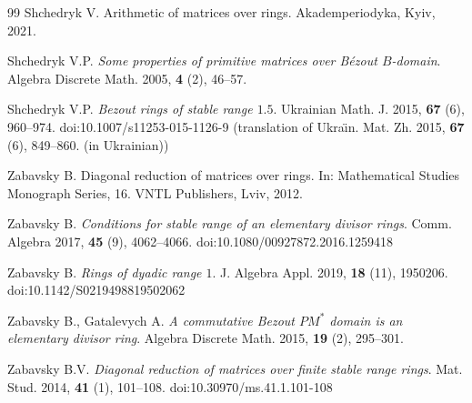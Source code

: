 \documentclass[10pt,a4paper]{amsart}
\theoremstyle{plain}
\theoremstyle{definition}
\begin{document}
\begin{thebibliography}{99}
 Shchedryk V. Arithmetic of matrices over rings.
Akademperiodyka, Kyiv, 2021. %

 Shchedryk V.P. \textit{Some properties of primitive matrices over B\'ezout $B$-domain}.
Algebra Discrete Math. 2005, \textbf{4} (2), 46--57.

 Shchedryk V.P. \textit{Bezout rings of stable range $1.5$}.
Ukrainian Math. J. 2015, \textbf{67} (6), 960--974. doi:10.1007/s11253-015-1126-9
(translation of Ukra\"{\i}n. Mat. Zh. 2015, \textbf{67} (6), 849--860. (in Ukrainian))

 Zabavsky B. Diagonal reduction of matrices over rings.
In: Mathematical Studies Monograph Series, 16.
VNTL Publishers, Lviv, 2012.

 Zabavsky B. \textit{Conditions for stable range of an elementary divisor rings}.
Comm. Algebra 2017, \textbf{45} (9), 4062--4066.
doi:10.1080/00927872.2016.1259418

 Zabavsky B. \textit{Rings of dyadic range $1$}.
J. Algebra Appl. 2019, \textbf{18} (11), 1950206.
doi:10.1142/S0219498819502062

 Zabavsky B., Gatalevych A. \textit{A commutative Bezout $PM^*$ domain is an elementary divisor ring}.
Algebra Discrete Math. 2015, \textbf{19} (2), 295--301.

 Zabavsky B.V. \textit{Diagonal reduction of matrices over finite stable range rings}.
Mat. Stud. 2014, \textbf{41} (1), 101--108.
doi:10.30970/ms.41.1.101-108
\end{thebibliography}
\end{document}
